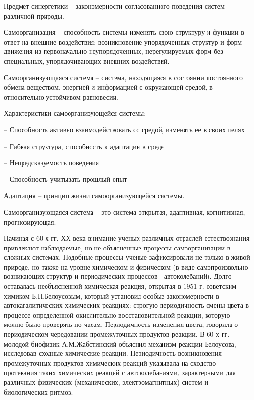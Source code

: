 \documentclass[exam_answers.tex]{subfiles}
\begin{document}
\renewcommand{\baselinestretch}{\blch}

Предмет синергетики -- закономерности согласованного поведения систем различной природы.

Самоорганизация -- способность системы изменять свою структуру и функции в ответ на
внешние воздействия; возникновение упорядоченных структур и форм движения из
первоначально неупорядоченных, нерегулируемых форм без
специальных, упорядочивающих внешних воздействий.

Самоорганизующаяся система -- система, находящаяся в состоянии
постоянного обмена веществом, энергией и информацией с
окружающей средой, в относительно устойчивом равновесии.

Характеристики самоорганизующейся системы:

-- Способность активно взаимодействовать со средой, изменять ее в
своих целях

-- Гибкая структура, способность к адаптации в среде

-- Непредсказуемость поведения

-- Способность учитывать прошлый опыт

Адаптация -- принцип жизни самоорганизующейся системы.

Самоорганизующаяся система – это система открытая, адаптивная, когнитивная, прогнозирующая.

Начиная с 60-х гг. ХХ века внимание ученых различных отраслей
естествознания привлекают наблюдаемые, но не объясненные процессы
самоорганизации в сложных системах. Подобные процессы ученые
зафиксировали не только в живой природе, но также на уровне химическом и
физическом (в виде самопроизвольно возникающих структур и периодических
процессов - автоколебаний). Долго оставалась необъясненной химическая
реакция, открытая в 1951 г. советским химиком Б.П.Белоусовым, который
установил особые закономерности в автокаталитических химических реакциях:
строгую периодичность смены цвета в процессе определенной
окислительно-восстановительной реакции, которую можно было проверять по часам.
Периодичность изменения цвета, говорила о периодическом чередовании
промежуточных продуктов реакции. В 60-х гг. молодой биофизик
А.М.Жаботинский объяснил механизм реакции Белоусова, исследовав сходные
химические реакции. Периодичность возникновения промежуточных
продуктов химических реакций указывала на сходство протекания таких
химических реакций с автоколебаниями, характерными для различных
физических (механических, электромагнитных) систем и биологических
ритмов.
\end{document}
